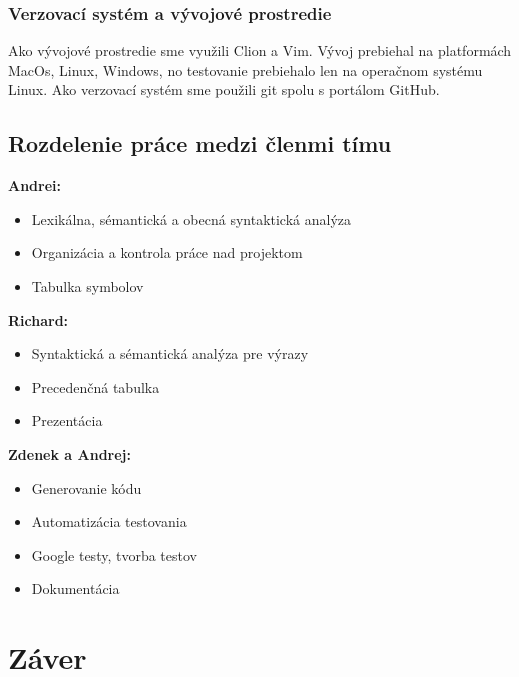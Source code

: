 \documentclass[a4paper, 11pt]{article}
\begin{document}
    \subsubsection{Verzovací systém a vývojové prostredie}
    Ako vývojové prostredie sme využili Clion a Vim. Vývoj prebiehal na platformách MacOs, Linux, Windows, no
    testovanie prebiehalo len na operačnom systému Linux. Ako verzovací systém sme použili git spolu s portálom
    GitHub.

    \subsection{Rozdelenie práce medzi členmi tímu}

    \textbf{Andrei:}
    \begin{itemize}
        \item  Lexikálna, sémantická a obecná syntaktická analýza
        \item  Organizácia a kontrola práce nad projektom
        \item  Tabulka symbolov
    \end{itemize}


    \textbf{Richard:}
    \begin{itemize}
        \item  Syntaktická a sémantická analýza pre výrazy
        \item  Precedenčná tabulka
        \item  Prezentácia
    \end{itemize}

    \textbf{Zdenek a Andrej:}
    \begin{itemize}
        \item  Generovanie kódu
        \item  Automatizácia testovania
        \item  Google testy, tvorba testov
        \item  Dokumentácia
    \end{itemize}


    \section{Záver}




    \clearpage
    
    \renewcommand{\refname}{Literatura}
    
\end{document}
